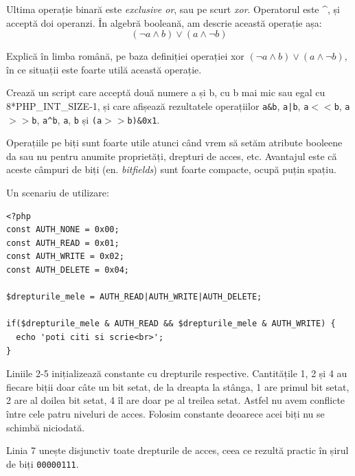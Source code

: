 Ultima operație binară este \textsl{exclusive or}, sau pe scurt
\textsl{xor}. Operatorul este \textasciicircum, și
acceptă doi operanzi. În algebră booleană, am descrie această operație așa:
\[(\lnot a \land b) \lor (a \land \lnot b)\]

\begin{Exercise}[title={Jonglează cu expresii boolene},difficulty=3]
Explică în limba română, pe baza definiției operației xor
$(\lnot a \land b) \lor (a \land \lnot b)$,
în ce situații este foarte utilă această operație.
\end{Exercise}


\begin{Exercise}[title={Operații pe biți}]
Crează un script care acceptă două numere a și b, cu b mai mic sau egal cu 8*PHP\_INT\_SIZE-1, și
care afișează rezultatele operațiilor \texttt{a\&b}, \texttt{a|b}, \texttt{a$<<$b},
\texttt{a$>>$b}, \texttt{a{\textasciicircum}b},
\texttt{{\texttildelow}a}, \texttt{{\texttildelow}b} și \texttt{(a$>>$b)\&0x1}.
\end{Exercise}

Operațiile pe biți sunt foarte utile atunci când vrem să setăm atribute booleene {\glqq}da sau nu{\grqq}
pentru anumite proprietăți, drepturi de acces, etc. Avantajul este că aceste câmpuri de biți
(en. \textsl{bitfields}) sunt foarte compacte, ocupă puțin spațiu.

Un scenariu de utilizare:
\begin{lstlisting}
<?php
const AUTH_NONE = 0x00;
const AUTH_READ = 0x01;
const AUTH_WRITE = 0x02;
const AUTH_DELETE = 0x04;

$drepturile_mele = AUTH_READ|AUTH_WRITE|AUTH_DELETE;

if($drepturile_mele & AUTH_READ && $drepturile_mele & AUTH_WRITE) {
  echo 'poti citi si scrie<br>';
}
\end{lstlisting}
Liniile 2-5 inițializează constante cu drepturile respective.  Cantitățile 1, 2 și 4
au fiecare biții doar câte un bit setat, de la dreapta la stânga, 1 are primul bit setat,
2 are al doilea bit setat, 4 îl are doar pe al treilea setat. Astfel nu avem conflicte
între cele patru niveluri de acces. Folosim constante
deoarece acei biți nu se schimbă niciodată.

Linia 7 unește disjunctiv toate drepturile de acces, ceea ce rezultă practic în șirul
de biți \texttt{00000111}.

